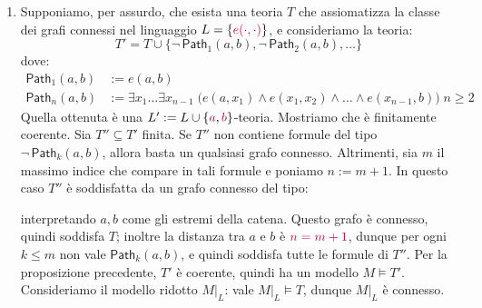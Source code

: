 \begin{soln}
\begin{enumerate}
        \item Supponiamo, per assurdo, che esista una teoria $T$ che assiomatizza la classe dei grafi connessi nel linguaggio $L = \{\textcolor{purple}{e(\cdot,\cdot)}\}$, e consideriamo la teoria:
        \[ T' = T \cup \{\neg\,\mathsf{Path}_1(a,b),\neg\,\mathsf{Path}_2(a,b),\ldots\}
        \]
        dove:
        \begin{align*}
                \mathsf{Path}_1(a,b) &:= e(a,b) \\
                \mathsf{Path}_n(a,b) &:= \exists x_1\ldots\exists x_{n-1}\;\bigl(e(a,x_1) \land e(x_1,x_2) \land \ldots \land e(x_{n-1},b)\bigr)\; n\geq 2
        \end{align*}
        Quella ottenuta è una $L' := L \cup \{\textcolor{purple}{a}, \textcolor{purple}{b}\}$-teoria.
        Mostriamo che è finitamente coerente. Sia $T'' \subseteq T'$ finita. Se $T''$ non contiene formule del tipo $\neg\,\mathsf{Path}_k(a,b)$, allora basta un qualsiasi grafo connesso. Altrimenti, sia $m$ il massimo indice che compare in tali formule e poniamo $n:=m+1$.
        In questo caso $T''$ è soddisfatta da un grafo connesso del tipo:
        \begin{center}
        \end{center}
        interpretando $a,b$ come gli estremi della catena. Questo grafo è connesso, quindi soddisfa $T$; inoltre la distanza tra $a$ e $b$ è $\textcolor{purple}{n=m+1}$, dunque per ogni $k\leq m$ non vale $\mathsf{Path}_k(a,b)$, e quindi soddisfa tutte le formule di $T''$.
        Per la proposizione precedente, $T'$ è coerente, quindi ha un modello $M \models T'$. Consideriamo il modello ridotto $M|_{L}$: vale $M|_{L} \models T$, dunque $M|_{L}$ è connesso.

\end{enumerate}
\end{soln}
